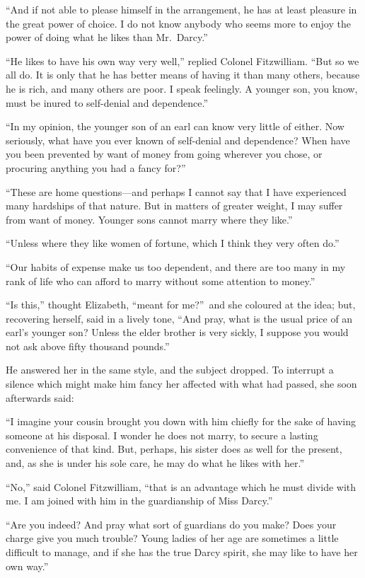 \documentclass[12pt,english,oneside]{book}
\begin{document}
{}``And if not able to please himself in the arrangement, he has
at least pleasure in the great power of choice. I do not know anybody
who seems more to enjoy the power of doing what he likes than Mr.\ Darcy.''

{}``He likes to have his own way very well,'' replied Colonel Fitzwilliam.
{}``But so we all do. It is only that he has better means of having
it than many others, because he is rich, and many others are poor.
I speak feelingly. A younger son, you know, must be inured to self-denial
and dependence.''

{}``In my opinion, the younger son of an earl can know very little
of either. Now seriously, what have you ever known of self-denial
and dependence? When have you been prevented by want of money from
going wherever you chose, or procuring anything you had a fancy for?''\ 

{}``These are home questions\mbox{---}and perhaps I cannot say that
I have experienced many hardships of that nature. But in matters of
greater weight, I may suffer from want of money. Younger sons cannot
marry where they like.''

{}``Unless where they like women of fortune, which I think they very
often do.''

{}``Our habits of expense make us too dependent, and there are too
many in my rank of life who can afford to marry without some attention
to money.''

{}``Is this,'' thought Elizabeth, {}``meant for me?''\ and she
coloured at the idea; but, recovering herself, said in a lively tone,
{}``And pray, what is the usual price of an earl's younger son? Unless
the elder brother is very sickly, I suppose you would not ask above
fifty thousand pounds.''

He answered her in the same style, and the subject dropped. To interrupt
a silence which might make him fancy her affected with what had passed,
she soon afterwards said:

{}``I imagine your cousin brought you down with him chiefly for the
sake of having someone at his disposal. I wonder he does not marry,
to secure a lasting convenience of that kind. But, perhaps, his sister
does as well for the present, and, as she is under his sole care,
he may do what he likes with her.''

{}``No,'' said Colonel Fitzwilliam, {}``that is an advantage which
he must divide with me. I am joined with him in the guardianship of
Miss Darcy.''

{}``Are you indeed? And pray what sort of guardians do you make?
Does your charge give you much trouble? Young ladies of her age are
sometimes a little difficult to manage, and if she has the true Darcy
spirit, she may like to have her own way.''
\end{document}
